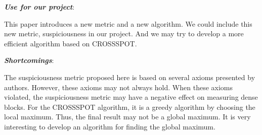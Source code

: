 \begin{itemize*}
\item {\em \textbf{Use for our project}}:

This paper introduces a new metric and a new algorithm. We could include this new metric, suspiciousness in our project. And we may try to develop a more efficient algorithm based on CROSSSPOT. \\ 


\item {\em \textbf{Shortcomings}}:

The suspiciousness metric proposed here is based on several axioms presented by authors. However, these axioms may not always hold. When these axioms violated, the suspiciousness metric may have a negative effect on measuring dense blocks. For the CROSSSPOT algorithm, it is a greedy algorithm by choosing the local maximum. Thus, the final result may not be a global maximum. It is very interesting to develop an algorithm for finding the global maximum. 

\end{itemize*}


